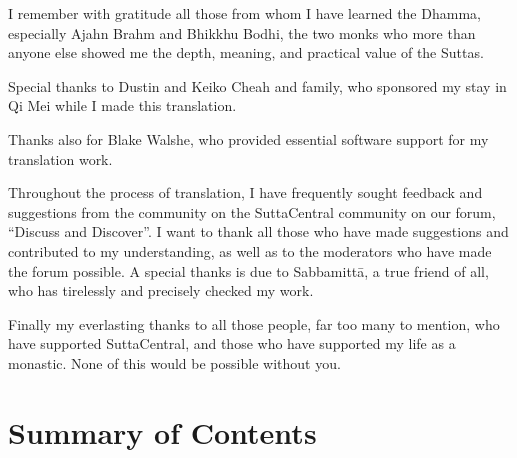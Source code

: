 \documentclass[12pt,openany]{book}%
\begin{document}
I remember with gratitude all those from whom I have learned the Dhamma, especially Ajahn Brahm and Bhikkhu Bodhi, the two monks who more than anyone else showed me the depth, meaning, and practical value of the Suttas.

Special thanks to Dustin and Keiko Cheah and family, who sponsored my stay in Qi Mei while I made this translation.

Thanks also for Blake Walshe, who provided essential software support for my translation work.

Throughout the process of translation, I have frequently sought feedback and suggestions from the community on the SuttaCentral community on our forum, “Discuss and Discover”. I want to thank all those who have made suggestions and contributed to my understanding, as well as to the moderators who have made the forum possible. A special thanks is due to \textsanskrit{Sabbamittā}, a true friend of all, who has tirelessly and precisely checked my work.

Finally my everlasting thanks to all those people, far too many to mention, who have supported SuttaCentral, and those who have supported my life as a monastic. None of this would be possible without you.

%
\chapter*{Summary of Contents}
\end{document}
